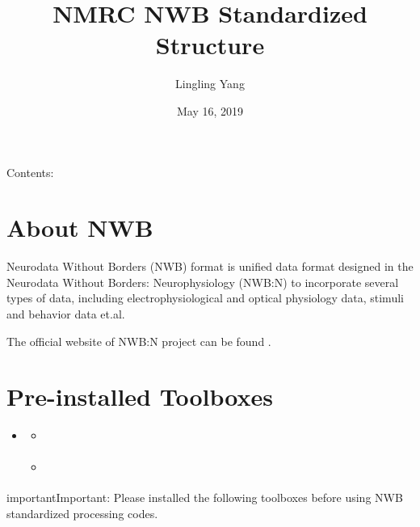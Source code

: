 \documentclass[letterpaper,10pt,english]{sphinxmanual}
\title{NMRC NWB Standardized Structure}
\date{May 16, 2019}
\author{Lingling Yang}
\begin{document}
\pagestyle{empty}
\sphinxmaketitle
\pagestyle{plain}
\sphinxtableofcontents
\pagestyle{normal}
\label{\detokenize{index::doc}}


Contents:


\chapter{About NWB}
\label{\detokenize{aboutNWB:about-nwb}}\label{\detokenize{aboutNWB::doc}}
Neurodata Without Borders (NWB) format is unified data format designed in the Neurodata Without Borders: Neurophysiology (NWB:N) to incorporate several types of data, including electrophysiological and optical physiology data, stimuli and behavior data et.al.

The official website of NWB:N project can be found .


\chapter{Pre-installed Toolboxes}
\label{\detokenize{pretoolboxes:pre-installed-toolboxes}}\label{\detokenize{pretoolboxes::doc}}
\begin{sphinxShadowBox}
\begin{itemize}
\item {} 
\label{\detokenize{pretoolboxes:id3}}{\hyperref[\detokenize{pretoolboxes:pre-installed-toolboxes}]{}}
\begin{itemize}
\item {} 
\label{\detokenize{pretoolboxes:id4}}{\hyperref[\detokenize{pretoolboxes:matnwb}]{}}

\item {} 
\label{\detokenize{pretoolboxes:id5}}{\hyperref[\detokenize{pretoolboxes:tdtmatlabsdk}]{}}

\end{itemize}

\end{itemize}
\end{sphinxShadowBox}

\begin{sphinxadmonition}{important}{Important:}
Please installed the following toolboxes before using NWB standardized processing codes.
\end{sphinxadmonition}
\end{document}
